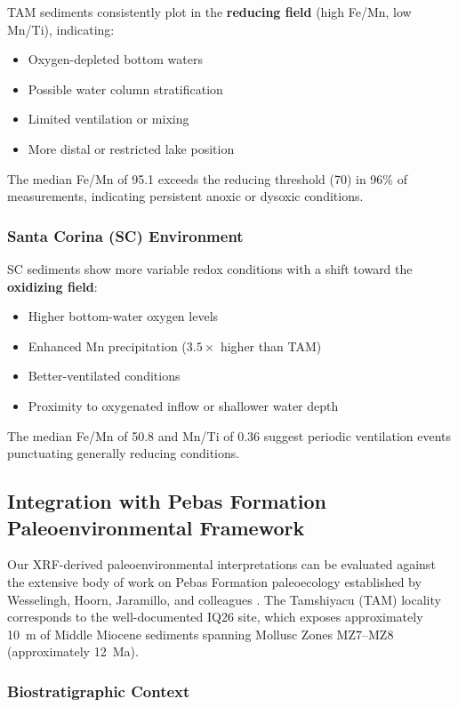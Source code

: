 TAM sediments consistently plot in the \textbf{reducing field} (high Fe/Mn, low Mn/Ti), indicating:
\begin{itemize}
\item Oxygen-depleted bottom waters
\item Possible water column stratification
\item Limited ventilation or mixing
\item More distal or restricted lake position
\end{itemize}

The median Fe/Mn of 95.1 exceeds the reducing threshold (70) in 96\% of measurements, indicating persistent anoxic or dysoxic conditions.

\subsubsection{Santa Corina (SC) Environment}

SC sediments show more variable redox conditions with a shift toward the \textbf{oxidizing field}:
\begin{itemize}
\item Higher bottom-water oxygen levels
\item Enhanced Mn precipitation ($3.5\times$ higher than TAM)
\item Better-ventilated conditions
\item Proximity to oxygenated inflow or shallower water depth
\end{itemize}

The median Fe/Mn of 50.8 and Mn/Ti of 0.36 suggest periodic ventilation events punctuating generally reducing conditions.

\subsection{Integration with Pebas Formation Paleoenvironmental Framework}

Our XRF-derived paleoenvironmental interpretations can be evaluated against the extensive body of work on Pebas Formation paleoecology established by Wesselingh, Hoorn, Jaramillo, and colleagues \citep{Wesselingh2002, Wesselingh2006a, Wesselingh2006b, Hoorn2010}. The Tamshiyacu (TAM) locality corresponds to the well-documented IQ26 site, which exposes approximately 10~m of Middle Miocene sediments spanning Mollusc Zones MZ7--MZ8 (approximately 12~Ma).

\subsubsection{Biostratigraphic Context}

